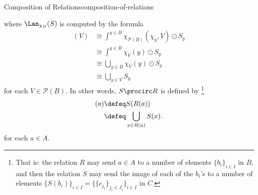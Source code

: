 \begin{definition}{Composition of Relations}{composition-of-relations}
\begin{itemize}
\begin{webcompile}
%
            \end{webcompile}
            where $\Lan_{\chi_{B}}(S)$ is computed by the formula
            \begin{align*}
                [\Lan_{\chi_{B}}(S)](V) &\cong \int^{y\in B}\chi_{\mathcal{P}(B)}(\chi_{y},V)\odot S_{y}\\
                                                   &\cong \int^{y\in B}\chi_{V}(y)\odot S_{y}\\%
                                                   &\cong \bigcup_{y\in B}\chi_{V}(y)\odot S_{y}\\
                                                   &\cong \bigcup_{y\in V}S_{y}
            \end{align*}
            for each $V\in\mathcal{P}(B)$. In other words, $S\procirc R$ is defined by%
            \footnote{%
                That is: the relation $R$ may send $a\in A$ to a number of elements $\{b_{i}\}_{i\in I}$ in $B$, and then the relation $S$ may send the image of each of the $b_{i}$'s to a number of elements $\{S(b_{i})\}_{i\in I}=\{\{c_{j_{i}}\}_{j_{i}\in J_{i}}\}_{i\in I}$ in $C$.
                \par\vspace*{-1.5\baselineskip}
            }%
            \begin{align*}
                [S\procirc R](a) &\defeq S(R(a))\\
                                 &\defeq \bigcup_{x\in R(a)}S(x).
            \end{align*}
            for each $a\in A$.
    \end{itemize}
\end{definition}
